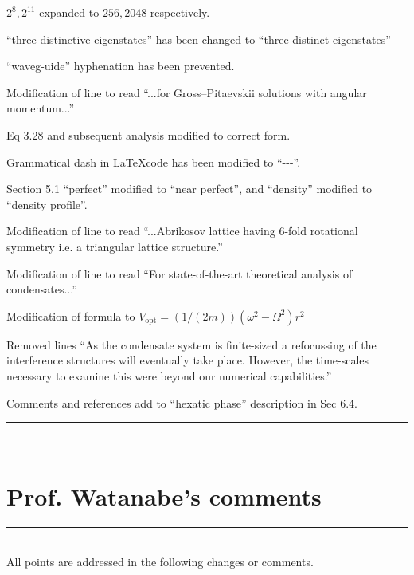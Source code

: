 \documentclass[paper=a4, fontsize=12pt]{scrartcl}
\begin{document}
\begin{description}[align=left]
    \item [P35] $2^8, 2^{11}$ expanded to $256,2048$ respectively.
    \item [P46] ``three distinctive eigenstates'' has been changed to ``three distinct eigenstates''
    \item [P49] ``waveg-uide'' hyphenation has been prevented.
    \item [P55] Modification of line to read ``...for Gross--Pitaevskii solutions with angular momentum...''
    \item [P61] Eq 3.28 and subsequent analysis modified to correct form.
    \item [P83] Grammatical dash in \LaTeX  code has been modified to ``-{}-{}-''.
    \item [P91] Section 5.1 ``perfect'' modified to ``near perfect'', and ``density'' modified to ``density profile''.
    \item [P91] Modification of line to read ``...Abrikosov lattice having 6-fold rotational symmetry i.e. a triangular lattice structure.''
    \item [P94] Modification of line to read ``For state-of-the-art theoretical analysis of condensates...''
    \item [P96] Modification of formula to $V_{\textrm{opt}} = (1/(2m))(\omega^2 - \Omega^2)r^2$
    \item [P104] Removed lines ``As the condensate system is finite-sized a refocussing of the interference structures will eventually take place. However, the time-scales necessary to examine this were beyond our numerical capabilities.''
    \item [P134] Comments and references add to ``hexatic phase'' description in Sec 6.4.
\end{description}
\noindent\rule{\textwidth}{1.5pt}\\[0.5cm]
\section{Prof. Watanabe's comments}
\rule{\textwidth}{1.5pt}\\[0.5cm]
All points are addressed in the following changes or comments.
\end{document}
